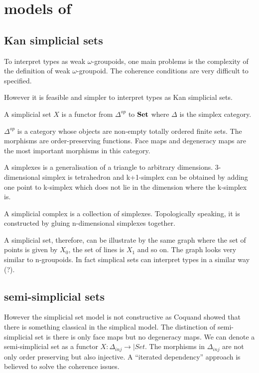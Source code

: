 \section{models of \hott}

\subsection{Kan simplicial sets}

To interpret types as weak $\omega$-groupoids, one main problems is
the complexity of the definition of weak $\omega$-groupoid. The
coherence conditions are very difficult to specified.

However it is feasible and simpler to interpret types as Kan
simplicial sets.

\begin{definition}
A simplicial set $X$ is a functor from $\Delta^{op}$ to $\operatorname{\mathbf{Set}}$ where
$\Delta$ is the simplex category.
\end{definition}

$\Delta^{op}$ is a category whose objects are non-empty totally ordered
finite sets. The morphisms are order-preserving functions. 
Face maps and degeneracy maps are the most important morphisms in this
category.  

A simplexes is a generalisation of a triangle to arbitrary
dimensions. 3-dimensional simplex is tetrahedron and k+1-simplex can
be obtained by adding one point to k-simplex which does not lie in the
dimension where the k-simplex is.

A simplicial complex is a collection of simplexes. Topologically speaking, it
is constructed by gluing n-dimensional simplexes together. 

A simplicial set, therefore, can be illustrate by the same graph where
the set of points is given by $X_0$, the set of lines is $X_1$ and so
on. The graph looks very similar to n-groupoids. In fact simplical
sets can interpret types in a similar way (?).


\subsection{semi-simplicial sets}

However the simplicial set model is not constructive as Coquand showed
that there is something classical in the simplical model.
The distinction of semi-simplicial set is there is only face maps
but no degeneracy maps. We can denote a semi-simplicial set as a
functor $X : \Delta_{inj} \rightarrow |Set$. The morphisms in $\Delta_{inj}$ are not only order preserving
but also injective.
A “iterated dependency” approach is believed to solve the coherence
issues.

